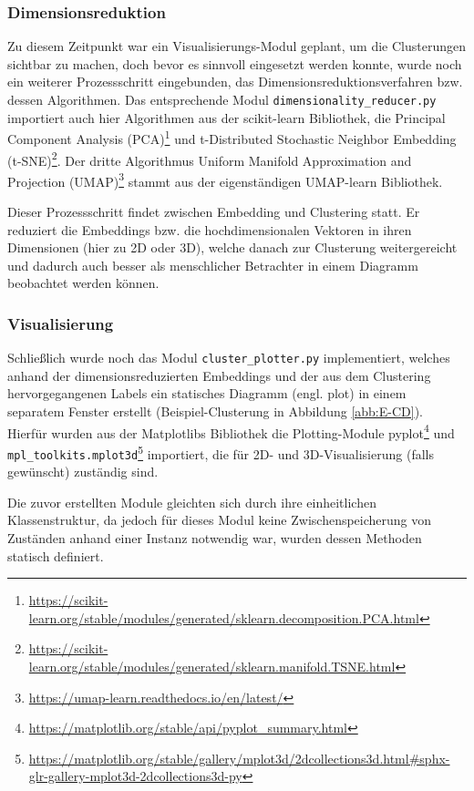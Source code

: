 \subsubsection*{Dimensionsreduktion}
Zu diesem Zeitpunkt war ein Visualisierungs-Modul geplant, um die Clusterungen sichtbar zu machen, doch bevor es sinnvoll eingesetzt werden konnte, wurde noch ein weiterer Prozessschritt eingebunden, das Dimensionsreduktionsverfahren bzw. dessen Algorithmen. Das entsprechende Modul \texttt{dimensionality\_reducer.py} importiert auch hier Algorithmen aus der scikit-learn Bibliothek, die Principal Component Analysis (PCA)\footnote{\url{https://scikit-learn.org/stable/modules/generated/sklearn.decomposition.PCA.html}} und t-Distributed Stochastic Neighbor Embedding (t-SNE)\footnote{\url{https://scikit-learn.org/stable/modules/generated/sklearn.manifold.TSNE.html}}. Der dritte Algorithmus Uniform Manifold Approximation and Projection (UMAP)\footnote{\url{https://umap-learn.readthedocs.io/en/latest/}} stammt aus der eigenständigen UMAP-learn Bibliothek. 

Dieser Prozessschritt findet zwischen Embedding und Clustering statt. Er reduziert die Embeddings bzw. die hochdimensionalen Vektoren in ihren Dimensionen (hier zu 2D oder 3D), welche danach zur Clusterung weitergereicht und dadurch auch besser als menschlicher Betrachter in einem Diagramm beobachtet werden können.


\subsubsection*{Visualisierung}
Schließlich wurde noch das Modul \texttt{cluster\_plotter.py} implementiert, welches anhand der dimensionsreduzierten Embeddings und der aus dem Clustering hervorgegangenen Labels ein statisches Diagramm (engl. plot) in einem separatem Fenster erstellt (Beispiel-Clusterung in Abbildung \ref{abb:E-CD}). Hierfür wurden aus der Matplotlibs Bibliothek die Plotting-Module pyplot\footnote{\url{https://matplotlib.org/stable/api/pyplot_summary.html}} und \texttt{mpl\_toolkits.mplot3d}\footnote{\url{https://matplotlib.org/stable/gallery/mplot3d/2dcollections3d.html\#sphx-glr-gallery-mplot3d-2dcollections3d-py}} importiert, die für 2D- und 3D-Visualisierung (falls gewünscht) zuständig sind.

Die zuvor erstellten Module gleichten sich durch ihre einheitlichen Klassenstruktur, da jedoch für dieses Modul keine Zwischenspeicherung von Zuständen anhand einer Instanz notwendig war, wurden dessen Methoden statisch definiert.


